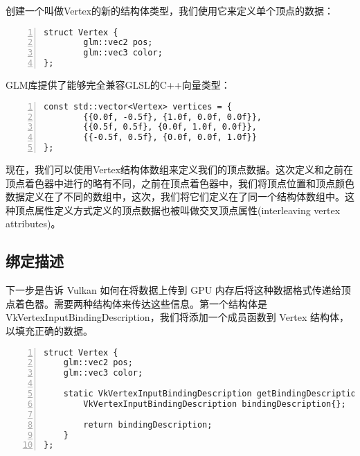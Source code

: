 \documentclass{ctexart}
\begin{document}
创建一个叫做Vertex的新的结构体类型，我们使用它来定义单个顶点的数据：

\begin{lstlisting}[language={[ANSI]C},keywordstyle=\color{blue!70},commentstyle=\color{red!50!green!50!blue!50},frame=shadowbox, rulesepcolor=\color{red!20!green!20!blue!20},basicstyle=\small,numbers=left, numberstyle=\tiny,breaklines=true]
struct Vertex {
		glm::vec2 pos;
		glm::vec3 color;
};
\end{lstlisting}

GLM库提供了能够完全兼容GLSL的C++向量类型：

\begin{lstlisting}[language={[ANSI]C},keywordstyle=\color{blue!70},commentstyle=\color{red!50!green!50!blue!50},frame=shadowbox, rulesepcolor=\color{red!20!green!20!blue!20},basicstyle=\small,numbers=left, numberstyle=\tiny,breaklines=true]
const std::vector<Vertex> vertices = {
		{{0.0f, -0.5f}, {1.0f, 0.0f, 0.0f}},
		{{0.5f, 0.5f}, {0.0f, 1.0f, 0.0f}},
		{{-0.5f, 0.5f}, {0.0f, 0.0f, 1.0f}}
};
\end{lstlisting}

现在，我们可以使用Vertex结构体数组来定义我们的顶点数据。这次定义和之前在顶点着色器中进行的略有不同，之前在顶点着色器中，我们将顶点位置和顶点颜色数据定义在了不同的数组中，这次，我们将它们定义在了同一个结构体数组中。这种顶点属性定义方式定义的顶点数据也被叫做交叉顶点属性(interleaving vertex attributes)。

\subsection{绑定描述}

下一步是告诉 Vulkan 如何在将数据上传到 GPU 内存后将这种数据格式传递给顶点着色器。需要两种结构体来传达这些信息。第一个结构体是 VkVertexInputBindingDescription，我们将添加一个成员函数到 Vertex 结构体，以填充正确的数据。
\begin{lstlisting}[language={[ANSI]C},keywordstyle=\color{blue!70},commentstyle=\color{red!50!green!50!blue!50},frame=shadowbox, rulesepcolor=\color{red!20!green!20!blue!20},basicstyle=\small,numbers=left, numberstyle=\tiny,breaklines=true]
struct Vertex {
	glm::vec2 pos;
	glm::vec3 color;

	static VkVertexInputBindingDescription getBindingDescription() {
		VkVertexInputBindingDescription bindingDescription{};

		return bindingDescription;
	}
};
\end{lstlisting}
\end{document}
